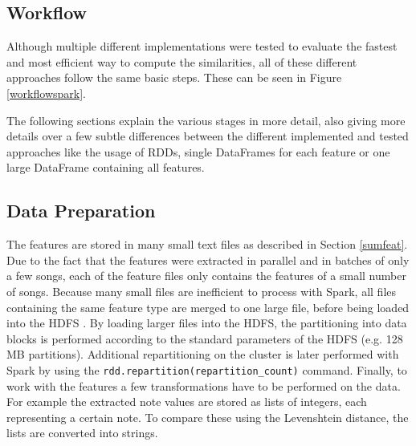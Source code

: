 \subsection{Workflow}

Although multiple different implementations were tested to evaluate the fastest and most efficient way to compute the similarities, all of these different approaches follow the same basic steps. These can be seen in Figure \ref{workflowspark}.  

\begin{figure}[htbp]
	\centering
\end{figure}
\FloatBarrier

\noindent The following sections explain the various stages in more detail, also giving more details over a few subtle differences between the different implemented and tested approaches like the usage of RDDs, single DataFrames for each feature or one large DataFrame containing all features. 

\subsection{Data Preparation}

The features are stored in many small text files as described in Section \ref{sumfeat}. Due to the fact that the features were extracted in parallel and in batches of only a few songs, each of the feature files only contains the features of a small number of songs. Because many small files are inefficient to process with Spark, all files containing the same feature type are merged to one large file, before being loaded into the HDFS \cite[p. 153]{sparkbook1}. By loading larger files into the HDFS, the partitioning into data blocks is performed according to the standard parameters of the HDFS (e.g. 128 MB partitions). Additional repartitioning on the cluster is later performed with Spark by using the \lstinline{rdd.repartition(repartition_count)} command. 
Finally, to work with the features a few transformations have to be performed on the data. For example the extracted note values are stored as lists of integers, each representing a certain note. To compare these using the Levenshtein distance, the lists are converted into strings. 

